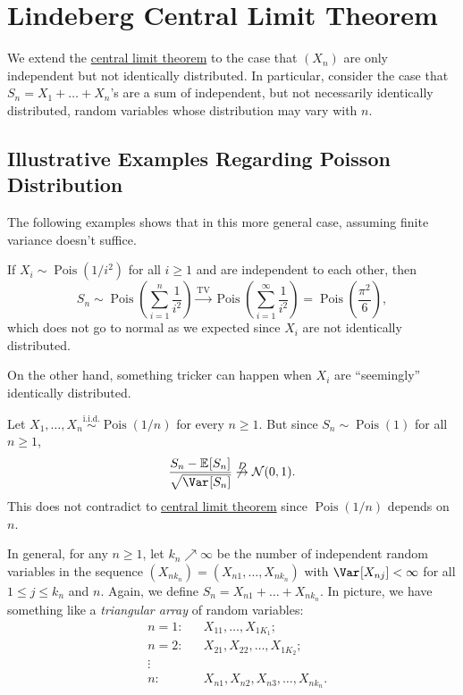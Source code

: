 \chapter{Lindeberg Central Limit Theorem}
We extend the \hyperref[thm:CLT]{central limit theorem} to the case that \((X_n)\) are only independent but not identically distributed. In particular, consider the case that \(S_n = X_1 + \dots + X_n\)'s are a sum of independent, but not necessarily identically distributed, random variables whose distribution may vary with \(n\).

\section{Illustrative Examples Regarding Poisson Distribution}
The following examples shows that in this more general case, assuming finite variance doesn't suffice.

\begin{eg}
	If \(X_i \sim \operatorname{Pois}(1 / i^2) \) for all \(i \geq 1\) and are independent to each other, then
	\[
		S_n \sim \operatorname{Pois}\left( \sum_{i=1}^{n} \frac{1}{i^2} \right)
		\overset{\operatorname{TV} }{\to} \operatorname{Pois}\left( \sum_{i=1}^{\infty} \frac{1}{i^2} \right)
		= \operatorname{Pois}\left( \frac{\pi ^2}{6} \right) ,
	\]
	which does not go to normal as we expected since \(X_i\) are not identically distributed.
\end{eg}

On the other hand, something tricker can happen when \(X_i\) are ``seemingly'' identically distributed.

\begin{eg}\label{eg:Poisson-CLT-fail}
	Let \(X_1, \dots , X_n \overset{\text{i.i.d.} }{\sim } \operatorname{Pois}(1 / n) \) for every \(n \geq 1\). But since \(S_n \sim \operatorname{Pois}(1) \) for all \(n \geq 1\),
	\[
		\frac{S_n - \mathbb{E}_{}[S_n] }{\sqrt{\Var_{}[S_n] } }
		\not \overset{D}{\to} \mathcal{N} (0, 1).
	\]
	This does not contradict to \hyperref[thm:CLT]{central limit theorem} since \(\operatorname{Pois}(1 / n) \) depends on \(n\).
\end{eg}

In general, for any \(n \geq 1\), let \(k_n \nearrow \infty \) be the number of independent random variables in the sequence \((X_{n k_n}) = (X_{n1}, \dots , X_{n k_n})\) with \(\Var_{}[X_{nj}] < \infty \) for all \(1 \leq j \leq k_n\) and \(n\). Again, we define \(S_n = X_{n1} + \dots + X_{n k_n}\). In picture, we have something like a \emph{triangular array} of random variables:
\[
	\begin{aligned}
		 & n=1 \colon &  & X_{11} , \dots , X_{1 K_1};                 \\
		 & n=2 \colon &  & X_{21}, X_{22} , \dots , X_{1 K_2};         \\
		 & \vdots     &  &                                             \\
		 & n \colon   &  & X_{n1} , X_{n2}, X_{n3}, \dots , X_{n k_n}.
	\end{aligned}
\]

